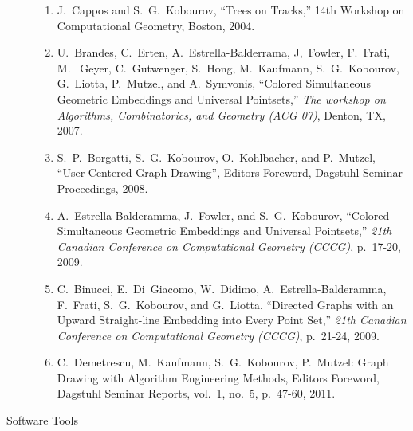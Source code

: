 \documentclass[10pt]{article}
\begin{document}
\begin{description}
\begin{enumerate}
\item J.~Cappos and S.~G.~Kobourov, ``Trees on Tracks,'' 14th Workshop on Computational Geometry, Boston, 2004.




\item U.~Brandes, C.~Erten, A.~Estrella-Balderrama,
  J,~Fowler, F.~Frati, M.~ Geyer, C.~Gutwenger, S.~Hong, M.~Kaufmann,
  S.~G.~Kobourov, G.~Liotta, P.~Mutzel, and A.~Symvonis, ``Colored
  Simultaneous Geometric Embeddings and Universal Pointsets,'' {\em
    The workshop on Algorithms, Combinatorics, and Geometry (ACG 07)}, Denton,
  TX, 2007.

\item S.~P.~Borgatti, S.~G.~Kobourov, O.~Kohlbacher, and P.~Mutzel,
  ``User-Centered Graph Drawing'', Editors Foreword, Dagstuhl Seminar Proceedings, 2008.

\item A.~Estrella-Balderamma, J.~Fowler, and S.~G.~Kobourov, ``Colored
  Simultaneous Geometric Embeddings and Universal Pointsets,'' {\em
    21th Canadian Conference on Computational Geometry (CCCG)},
  p.~17-20, 2009. 

\item C.~Binucci, E.~Di~Giacomo, W.~Didimo, A.~Estrella-Balderamma,
  F.~Frati, S.~G.~Kobourov, and G.~Liotta, ``Directed Graphs with an
  Upward Straight-line Embedding into Every Point Set,'' {\em 21th
    Canadian Conference on Computational Geometry (CCCG)}, p.~21-24, 2009. 

\item C.~Demetrescu, M.~Kaufmann, S.~G.~Kobourov, P.~Mutzel:
Graph Drawing with Algorithm Engineering Methods, Editors Foreword, Dagstuhl Seminar
Reports, vol.~1, no.~5, p.~47-60, 2011.


\end{enumerate}

\item [Software Tools]\


\end{description}
\end{document}
